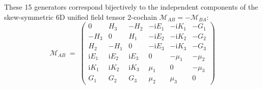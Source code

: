 \documentclass[
    12pt,
    a4paper,
    headings=normal,
    twoside=false,
    open=any,
    parskip=half
]{scrbook}
\newcommand{\iu}{\mathrm{i}}
\begin{document}
These 15 generators correspond bijectively to the independent components of the skew-symmetric 6D unified field tensor 2-cochain $\mathcal{M}_{AB} = -\mathcal{M}_{BA}$:
\begin{equation}
\mathcal{M}_{AB} \;=\; \begin{pmatrix}
0 & H_3 & -H_2 & -\iu E_1 & -\iu K_1 & -G_1 \\
-H_3 & 0 & H_1 & -\iu E_2 & -\iu K_2 & -G_2 \\
H_2 & -H_1 & 0 & -\iu E_3 & -\iu K_3 & -G_3 \\
\iu E_1 & \iu E_2 & \iu E_3 & 0 & -\mu_1 & -\mu_2 \\
\iu K_1 & \iu K_2 & \iu K_3 & \mu_1 & 0 & -\mu_3 \\
G_1 & G_2 & G_3 & \mu_2 & \mu_3 & 0
\end{pmatrix}
\label{eq:ch8_M_AB_matrix_intuitive}
\end{equation}
\end{document}
